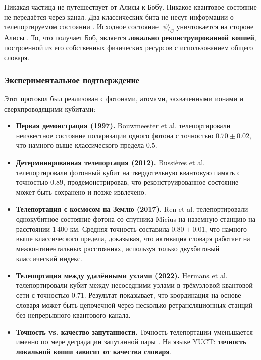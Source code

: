 \documentclass[12pt,a4paper]{article}
\theoremstyle{remark}
\begin{document}
	Никакая частица не путешествует от Алисы к Бобу. Никакое квантовое состояние не передаётся через канал. Два классических бита не несут информации о телепортируемом состоянии \cite{Pirandola2017}. Исходное состояние $|\psi\rangle_C$ уничтожается на стороне Алисы \cite{Wootters1982}. То, что получает Боб, является \textbf{локально реконструированной копией}, построенной из его собственных физических ресурсов с использованием общего словаря.
	
	\subsubsection{Экспериментальное подтверждение}
	
	Этот протокол был реализован с фотонами, атомами, захваченными ионами и сверхпроводящими кубитами:
	
	\begin{itemize}
		\item \textbf{Первая демонстрация (1997).} Bouwmeester et al. \cite{Bouwmeester1997} телепортировали неизвестное состояние поляризации одного фотона с точностью $0.70 \pm 0.02$, что намного выше классического предела $0.5$.
		\item \textbf{Детерминированная телепортация (2012).} Bussi\`eres et al. телепортировали фотонный кубит на твердотельную квантовую память с точностью $0.89$, продемонстрировав, что реконструированное состояние может быть сохранено и позже извлечено.
		\item \textbf{Телепортация с космосом на Землю (2017).} Ren et al. \cite{Ren2017} телепортировали однокубитное состояние фотона со спутника Micius на наземную станцию на расстоянии $1\,400$ км. Средняя точность составила $0.80 \pm 0.01$, что намного выше классического предела, доказывая, что активация словаря работает на межконтинентальных расстояниях, используя только двухбитовый классический индекс.
		\item \textbf{Телепортация между удалёнными узлами (2022).} Hermans et al. телепортировали кубит между несоседними узлами в трёхузловой квантовой сети с точностью $0.71$. Результат показывает, что координация на основе словаря может быть цепочечной через несколько ретрансляционных станций без непрерывного квантового канала.
		\item \textbf{Точность vs. качество запутанности.} Точность телепортации уменьшается именно по мере деградации запутанной пары \cite{Knill2005}. На языке YUCT: \textbf{точность локальной копии зависит от качества словаря}.
	\end{itemize}
	
\end{document}
